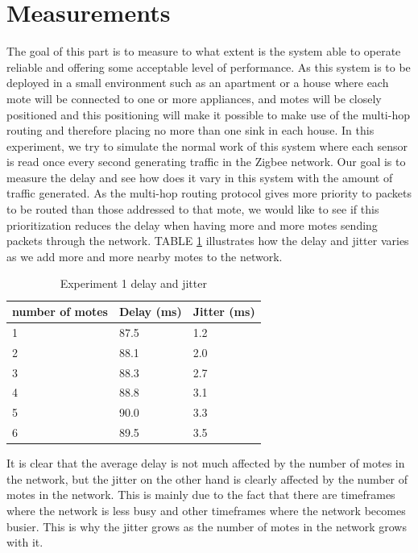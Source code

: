 \documentclass[conference]{IEEEtran}
\begin{document}
\section{Measurements}
The goal of this part is to measure to what extent is the system able to operate reliable and offering some acceptable level of performance. As this system is to be deployed in a small environment such as an apartment or a house where each mote will be connected to one or more appliances, and motes will be closely positioned and this positioning will make it possible to make use of the multi-hop routing and therefore placing no more than one sink in each house. In this experiment, we try to simulate the normal work of this system where each sensor is read once every second generating traffic in the Zigbee network. Our goal is to measure the delay and see how does it vary in this system with the amount of traffic generated. As the multi-hop routing protocol gives more priority to packets to be routed than those addressed to that mote, we would like to see if this prioritization reduces the delay when having more and more motes sending packets through the network. TABLE \ref{table:exp1} illustrates how the delay and jitter varies as we add more and more nearby motes to the network.
\begin{table}[htbp]
    \begin{tabular}{lll}
    \hline
    number of motes & Delay (ms) & Jitter (ms) \\\hline
    1               & 87.5         & 1.2         \\ 
    2               & 88.1         & 2.0         \\
    3               & 88.3        & 2.7         \\
    4               & 88.8         & 3.1         \\
    5               & 90.0         & 3.3         \\
    6               & 89.5         & 3.5         \\
    \end{tabular}
    \caption{Experiment 1 delay and jitter}
    \label{table:exp1}
\end{table}
It is clear that the average delay is not much affected by the number of motes in the network, but the jitter on the other hand is clearly affected by the number of motes in the network. This is mainly due to the fact that there are timeframes where the network is less busy and other timeframes where the network becomes busier. This is why the jitter grows as the number of motes in the network grows with it.
\end{document}

